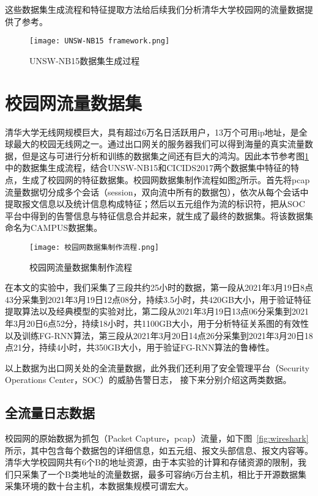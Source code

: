 这些数据集生成流程和特征提取方法给后续我们分析清华大学校园网的流量数据提供了参考。


\begin{figure}
    \centering
    \texttt{[image: UNSW-NB15 framework.png]}
    \caption{UNSW-NB15数据集生成过程}
    \label{fig:UNSW-NB15数据集生成过程}
  \end{figure}


\section{校园网流量数据集}
清华大学无线网规模巨大，具有超过6万名日活跃用户，13万个可用ip地址，是全球最大的校园无线网之一。通过出口网关的服务器我们可以得到海量的真实流量数据，但是这与可进行分析和训练的数据集之间还有巨大的鸿沟。因此本节参考图\ref{fig:UNSW-NB15数据集生成过程}中的数据集生成流程，结合UNSW-NB15和CICIDS2017两个数据集中特征的特点，生成了校园网的特征数据集。校园网数据集制作流程如图\ref{fig:流量数据集制作流程}所示。首先将pcap流量数据切分成多个会话（session，双向流中所有的数据包），依次从每个会话中提取报文信息以及统计信息构成特征；然后以五元组作为流的标识符，把从SOC平台中得到的告警信息与特征信息合并起来，就生成了最终的数据集。将该数据集命名为CAMPUS数据集。
\begin{figure}
    \centering
    \texttt{[image: 校园网数据集制作流程.png]}

    \caption{校园网流量数据集制作流程}
    \label{fig:流量数据集制作流程}
  \end{figure}

在本文的实验中，我们采集了三段共约25小时的数据，第一段从2021年3月19日8点43分采集到2021年3月19日12点08分，持续3.5小时，共420GB大小，用于验证特征提取算法以及经典模型的实验对比，第二段从2021年3月19日13点06分采集到2021年3月20日6点52分，持续18小时，共1100GB大小，用于分析特征关系图的有效性以及训练FG-RNN算法，第三段从2021年3月20日14点26分采集到2021年3月20日18点21分，持续4小时，共350GB大小，用于验证FG-RNN算法的鲁棒性。

以上数据为出口网关处的全流量数据，此外我们还利用了安全管理平台（Security Operations Center，SOC）的威胁告警日志，
接下来分别介绍这两类数据。

\subsection{全流量日志数据}
校园网的原始数据为抓包（Packet Capture，pcap）流量，如下图~\ref{fig:wireshark}所示，其中包含每个数据包的详细信息，如五元组、报文头部信息、报文内容等。清华大学校园网共有6个B的地址资源，由于本实验的计算和存储资源的限制，我们只采集了一个B类地址的流量数据，最多可容纳6万台主机，相比于开源数据集采集环境的数十台主机，本数据集规模可谓宏大。

